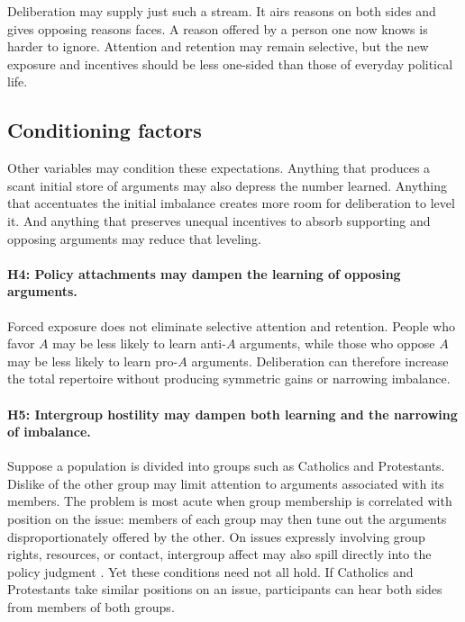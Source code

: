 \documentclass{article}
\begin{document}
Deliberation may supply just such a stream. It airs reasons on both sides and gives opposing
reasons faces. A reason offered by a person one now knows is harder to ignore. Attention and
retention may remain selective, but the new exposure and incentives should be less one-sided
than those of everyday political life.

\subsection{Conditioning factors}

Other variables may condition these expectations. Anything that produces a scant initial store
of arguments may also depress the number learned. Anything that accentuates the initial
imbalance creates more room for deliberation to level it. And anything that preserves unequal
incentives to absorb supporting and opposing arguments may reduce that leveling.

\paragraph{H4: Policy attachments may dampen the learning of opposing arguments.}
Forced exposure does not eliminate selective attention and retention. People who favor $A$
may be less likely to learn anti-$A$ arguments, while those who oppose $A$ may be less likely to
learn pro-$A$ arguments. Deliberation can therefore increase the total repertoire without
producing symmetric gains or narrowing imbalance.

\paragraph{H5: Intergroup hostility may dampen both learning and the narrowing of imbalance.}
Suppose a population is divided into groups such as Catholics and Protestants. Dislike of the
other group may limit attention to arguments associated with its members. The problem is most
acute when group membership is correlated with position on the issue: members of each group
may then tune out the arguments disproportionately offered by the other. On issues expressly
involving group rights, resources, or contact, intergroup affect may also spill directly into
the policy judgment \citep{altemeyer1996authoritarian,marcus1995malice,kim2011contact}.
Yet these conditions need not all hold. If Catholics and Protestants take
similar positions on an issue, participants can hear both sides from members of both groups.
\end{document}
